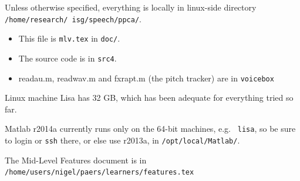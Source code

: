 \documentclass[11pt]{article}
\begin{document}
Unless otherwise specified, everything is
  locally in linux-side directory {\tt
    /home/research/ isg/speech/ppca/}.

\begin{itemize}
\item   This file is {\tt mlv.tex} in {\tt doc/}.
\item  The source code is in {\tt src4}.
\item  readau.m, readwav.m and fxrapt.m (the pitch tracker) are in {\tt voicebox}
\end{itemize}


Linux machine Lisa has 32 GB, which has been adequate for everything
tried so far.

Matlab r2014a currently runs only on the 64-bit machines, e.g. {\tt
  lisa}, so be sure to login or {\tt ssh} there, or else use r2013a,
in {\tt /opt/local/Matlab/}.

The Mid-Level Features document is in
{\tt /home/users/nigel/paers/learners/features.tex}




\end{document}

